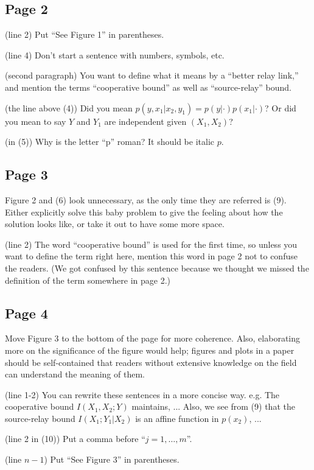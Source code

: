 \documentclass[10pt]{article}
\newenvironment{tight_itemize}
{\begin{itemize}
  \setlength{\itemsep}{0pt}
  \setlength{\parskip}{0pt}
  \setlength{\parsep}{0pt}}
{\end{itemize}}
\begin{document}
\subsection*{Page 2}
\begin{tight_itemize}
\item (line 2) Put ``See Figure 1'' in parentheses.
\item (line 4) Don't start a sentence with numbers, symbols, etc.
\item (second paragraph) You want to define what it means by a ``better relay link,'' and mention the terms ``cooperative bound'' as well as ``source-relay'' bound.
\item (the line above (4)) Did you mean $p(y, x_1|x_2, y_1) = p(y|\cdot)p(x_1|\cdot)$? Or did you mean to say $Y$ and $Y_1$ are independent given $(X_1, X_2)$?
\item (in (5)) Why is the letter ``p'' roman? It should be italic $p$.
\end{tight_itemize}

\subsection*{Page 3}
\begin{tight_itemize}
\item Figure 2 and (6) look unnecessary, as the only time they are referred is (9). Either explicitly solve this baby problem to give the feeling about how the solution looks like, or take it out to have some more space.
\item (line 2) The word ``cooperative bound'' is used for the first time, so unless you want to define the term right here, mention this word in page 2 not to confuse the readers. (We got confused by this sentence because we thought we missed the definition of the term somewhere in page 2.)
\end{tight_itemize}

\subsection*{Page 4}
\begin{tight_itemize}
\item Move Figure 3 to the bottom of the page for more coherence. Also, elaborating more on the significance of the figure would help; figures and plots in a paper should be self-contained that readers without extensive knowledge on the field can understand the meaning of them.
\item (line 1-2) You can rewrite these sentences in a more concise way. e.g. The cooperative bound $I(X_1, X_2;Y)$ maintains, ... Also, we see from (9) that the source-relay bound $I(X_1; Y_1|X_2)$ is an affine function in $p(x_2)$, ...
\item (line 2 in (10)) Put a comma before ``$j = 1, \ldots, m$''.
\item (line $n-1$) Put ``See Figure 3'' in parentheses.
\end{tight_itemize}
\end{document}
